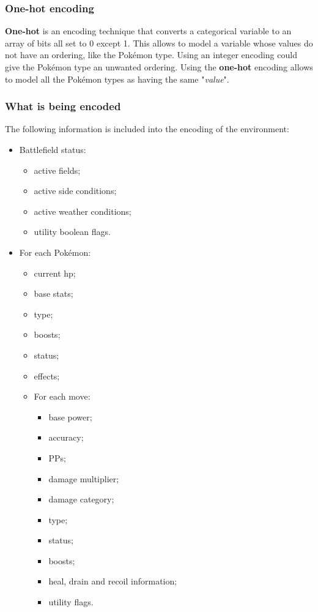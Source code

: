 \documentclass{article}
\begin{document}
\subsubsection{One-hot encoding}

\textbf{One-hot} is an encoding technique that converts a categorical variable to an array of bits all set to 0 except 1.
This allows to model a variable whose values do not have an ordering, like the Pokémon type.
Using an integer encoding could give the Pokémon type an unwanted ordering.
Using the \textbf{one-hot} encoding allows to model all the Pokémon types as having the same "\textit{value}".

\subsubsection{What is being encoded} \label{encoding}

The following information is included into the encoding of the environment:
\begin{itemize}
    \item Battlefield status:
    \begin{itemize}
        \item active fields;
        \item active side conditions;
        \item active weather conditions;
        \item utility boolean flags.
    \end{itemize}
    \item For each Pokémon:
    \begin{itemize}
        \item current hp;
        \item base stats;
        \item type;
        \item boosts;
        \item status;
        \item effects;
        \item For each move:
        \begin{itemize}
            \item base power;
            \item accuracy;
            \item PPs;
            \item damage multiplier;
            \item damage category;
            \item type;
            \item status;
            \item boosts;
            \item heal, drain and recoil information;
            \item utility flags.
        \end{itemize}
    \end{itemize}
\end{itemize}
\end{document}
